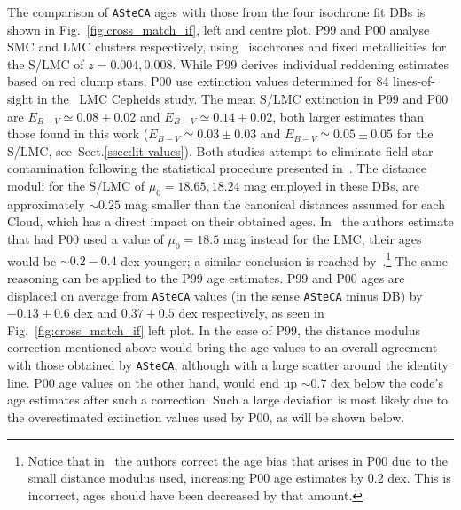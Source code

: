 \documentclass[a4paper,fleqn,usenatbib]{mnras}
\begin{document}
%
%
The comparison of \texttt{ASteCA} ages with those from the four isochrone
fit DBs is shown in Fig.~\ref{fig:cross_match_if}, left and centre plot.
%
P99 and P00 analyse SMC and LMC clusters respectively,
using~\cite{Bertelli_1994} isochrones and fixed metallicities for the S/LMC of
$z{=}0.004, 0.008$. While P99 derives individual reddening estimates based on
red clump stars, P00 use extinction values determined for 84 lines-of-sight
in the~\cite{Udalski_1999} LMC Cepheids study. The mean S/LMC extinction in P99
and P00 are $E_{B-V}{\simeq}0.08{\pm}0.02$ and $E_{B-V}{\simeq}0.14{\pm}0.02$, 
both larger estimates than those found in this work
($E_{B-V}{\simeq}0.03{\pm}0.03$ and $E_{B-V}{\simeq}0.05{\pm}0.05$ for the S/LMC,
see~Sect.\ref{ssec:lit-values}).
%
Both studies attempt to eliminate field star contamination following the
statistical procedure presented in~\cite{Mateo_1986}.
The distance moduli for the S/LMC of $\mu_0{=}18.65, 18.24$ mag employed in
these DBs, are approximately ${\sim}0.25$ mag smaller than the canonical
distances assumed for each Cloud, which has a direct impact on their obtained
ages.
%
In~\cite{de_Grijs_2006} the authors estimate that had P00 used a value
of $\mu_0{=}18.5$ mag instead for the LMC, their ages would be ${\sim}0.2{-}0.4$
dex younger; a similar conclusion is reached
by~\cite{Baumgardt_2013}.\footnote{Notice that in~\cite{Baumgardt_2013} the
authors correct the age bias that arises in P00 due to the small distance
modulus used, increasing P00 age estimates by 0.2 dex. This is incorrect, ages
should have been decreased by that amount.} The same reasoning can be applied to
the P99 age estimates.\@
%
P99 and P00 ages are displaced on average from \texttt{ASteCA} values (in the
sense \texttt{ASteCA} minus DB) by $-0.13\pm0.6$ dex and $0.37\pm0.5$ dex
respectively, as seen in Fig.~\ref{fig:cross_match_if} left plot.
In the case of P99, the distance modulus correction mentioned above would
bring the age values to an overall agreement with those obtained by
\texttt{ASteCA}, although with a large scatter around the identity line.
%
P00 age values on the other hand, would end up ${\sim}0.7$ dex below the code's
age estimates after such a correction. Such a large deviation is most likely due
to the overestimated extinction values used by P00, as will be shown below.
\end{document}
